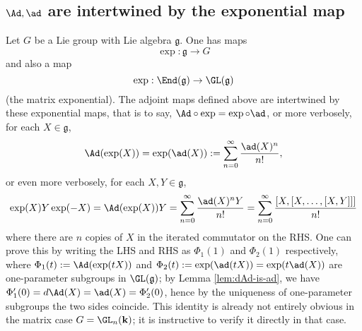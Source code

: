 \documentclass[reqno]{amsart} 
\begin{document}
\subsection{\texorpdfstring{$\Ad, \ad$}{Ad, ad} are intertwined by the exponential map\label{sec:Ad-ad-intertwined-exp}}
\label{sec:orgcb8cdaf}
Let $G$ be a Lie group with Lie algebra $\mathfrak{g}$.
One has maps
\begin{equation*}
  \exp : \mathfrak{g} \rightarrow G
\end{equation*}
and also a map
\begin{equation*}
  \exp : \End(\mathfrak{g}) \rightarrow \GL(\mathfrak{g})
\end{equation*}
(the matrix exponential).
The adjoint maps defined above  are intertwined
by these exponential maps,
that is to say,
$\Ad \circ \exp = \exp \circ \ad$,
or more verbosely,
for each $X \in \mathfrak{g}$,
\begin{equation*}
  \Ad(\exp(X)) = \exp(\ad(X))
  :=
  \sum_{n = 0}^{\infty} \frac{\ad(X)^n}{n!},
\end{equation*}
or even more verbosely,
for each $X,Y \in \mathfrak{g}$,
\begin{equation*}
  \exp(X) Y \exp(-X)
  =\Ad(\exp(X)) Y
  =
  \sum_{n=0}^{\infty}
  \frac{\ad(X)^n Y}{n!}
  =
  \sum_{n=0}^{\infty}
  \frac{[X,[X,\dotsc,[X,Y]]]}{n!}
\end{equation*}
where there are $n$ copies of $X$ in the iterated commutator
on the RHS.
One can prove this by writing the LHS and RHS
as $\Phi_1(1)$ and $\Phi_2(1)$ respectively,
where $\Phi_1(t) := \Ad(\exp(t X))$ and $\Phi_2(t) := \exp(\ad(t
X))
= \exp(t \ad(X))$ are one-parameter subgroups
in $\GL(\mathfrak{g})$;
by  Lemma \ref{lem:dAd-is-ad},
we have $\Phi_1'(0) = d \Ad(X) = \ad(X) = \Phi_2'(0)$,
hence by the uniqueness of one-parameter subgroups
the two sides coincide.
This identity is already not entirely obvious in the matrix
case $G = \GL_n(\mathbf{k})$;
it is instructive to verify it directly in that case.
\end{document}
